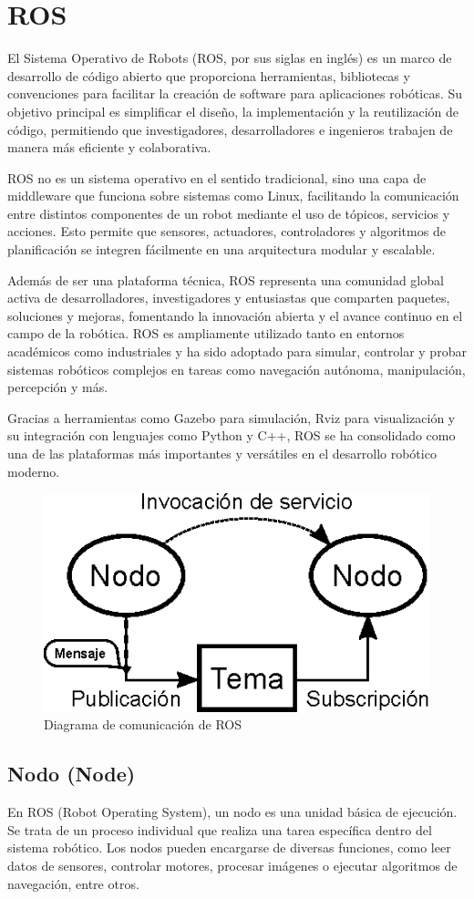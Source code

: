 \section{ROS} \label{sec:ros}
El Sistema Operativo de Robots (ROS, por sus siglas en inglés) es un marco de desarrollo de código abierto que proporciona herramientas, bibliotecas y convenciones para facilitar la creación de software para aplicaciones robóticas. Su objetivo principal es simplificar el diseño, la implementación y la reutilización de código, permitiendo que investigadores, desarrolladores e ingenieros trabajen de manera más eficiente y colaborativa.

ROS no es un sistema operativo en el sentido tradicional, sino una capa de middleware que funciona sobre sistemas como Linux, facilitando la comunicación entre distintos componentes de un robot mediante el uso de tópicos, servicios y acciones. Esto permite que sensores, actuadores, controladores y algoritmos de planificación se integren fácilmente en una arquitectura modular y escalable.

Además de ser una plataforma técnica, ROS representa una comunidad global activa de desarrolladores, investigadores y entusiastas que comparten paquetes, soluciones y mejoras, fomentando la innovación abierta y el avance continuo en el campo de la robótica. ROS es ampliamente utilizado tanto en entornos académicos como industriales y ha sido adoptado para simular, controlar y probar sistemas robóticos complejos en tareas como navegación autónoma, manipulación, percepción y más.

Gracias a herramientas como Gazebo para simulación, Rviz para visualización y su integración con lenguajes como Python y C++, ROS se ha consolidado como una de las plataformas más importantes y versátiles en el desarrollo robótico moderno.
\begin{figure}[h]
	\centering
	\includegraphics[width=0.5\linewidth]{img/ROS_concepts}
	\caption{Diagrama de comunicación de ROS}
	\label{fig:rosconcepts}
\end{figure}

\subsection{Nodo (Node)}
En ROS (Robot Operating System), un nodo es una unidad básica de ejecución. Se trata de un proceso individual que realiza una tarea específica dentro del sistema robótico. Los nodos pueden encargarse de diversas funciones, como leer datos de sensores, controlar motores, procesar imágenes o ejecutar algoritmos de navegación, entre otros.

